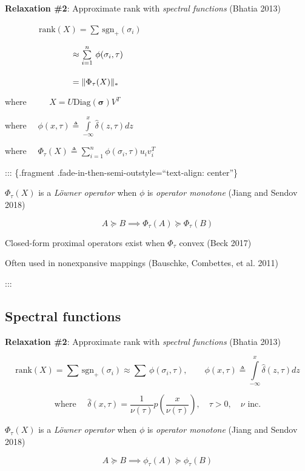 \documentclass[
  letterpaper,
  DIV=11,
  numbers=noendperiod,
  oneside]{scrartcl}
\begin{document}
\textbf{Relaxation \#2}: Approximate \(\mathrm{rank}\) with
\emph{spectral functions} (Bhatia 2013)

\(\quad\quad\quad\quad \mathrm{rank}(X) = \sum \, \mathrm{sgn}_+(\sigma_i)\)

\(\quad\quad\quad\quad \hphantom{\mathrm{rank}(X)}\approx \sum\limits_{i=1}^n \, \phi(\sigma_i, \tau) \phantom{\int\limits_{-\infty}^x}\)

\(\quad\quad\quad\quad \hphantom{\mathrm{rank}(X)}=\lVert \Phi_\tau(X) \rVert_\ast\)

where \(\quad\quad\) \(X = U \mathrm{Diag}(\mathbf{\sigma})V^T\)

where
\(\quad \phi(x, \tau) \triangleq \int\limits_{-\infty}^x\hat{\delta}(z, \tau) dz\)

where
\(\quad \Phi_\tau(X) \triangleq \sum_{i=1}^n \phi(\sigma_i, \tau) u_i v_i^T\)

::: \{.fragment .fade-in-then-semi-outstyle=``text-align: center''\}

\(\Phi_\tau(X)\) is a \emph{Löwner operator} when \(\phi\) is
\emph{operator monotone} (Jiang and Sendov 2018)

\[ A \succeq B \implies \Phi_\tau(A) \succeq \Phi_\tau(B) \]

Closed-form proximal operators exist when \(\Phi_\tau\) convex (Beck
2017)

Often used in nonexpansive mappings (Bauschke, Combettes, et al. 2011)

:::

\subsection{Spectral functions}\label{spectral-functions-1}

\textbf{Relaxation \#2}: Approximate \(\mathrm{rank}\) with
\emph{spectral functions} (Bhatia 2013)

\[\mathrm{rank}(X) = \sum \, \mathrm{sgn}_+(\sigma_i) \approx \sum \, \phi(\sigma_i, \tau), \quad \quad \phi(x, \tau) \triangleq \int\limits_{-\infty}^x\hat{\delta}(z, \tau) dz\]

\[ \text{ where } \quad \hat{\delta}(x, \tau) = \frac{1}{\nu(\tau)} p\left(\frac{x}{\nu(\tau)}\right), \quad \tau > 0, \quad \nu \text{ inc. }\]

\(\Phi_\tau(X)\) is a \emph{Löwner operator} when \(\phi\) is
\emph{operator monotone} (Jiang and Sendov 2018)

\[ A \succeq B \implies \phi_\tau(A) \succeq \phi_\tau(B) \]
\end{document}
